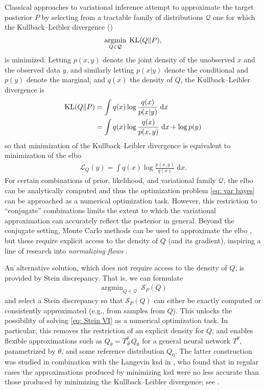 \documentclass[12pt,paper=letter]{scrreprt}
\def\KL#1#2{\textnormal{KL}({#1}\Vert{#2})}
\providecommand{\argmin}{\mathop\mathrm{arg min}}
\begin{document}
Classical approaches to variational inference attempt to approximate the target posterior $P$ by selecting from a tractable family of distributions $\mathcal{Q}$ one for which the Kullback–Leibler divergence ()
\begin{align}
\argmin_{Q \in \mathcal Q} \; \KL{Q}{P},  \label{eq: var bayes}
\end{align}
is minimized.
Letting $p(x,y)$ denote the joint density of the unobserved $x$ and the observed data $y$, and similarly letting $p(x|y)$ denote the conditional and $p(y)$ denote the marginal, and $q(x)$ the density of $Q$, the Kullback--Leibler divergence is
\begin{align*}
\KL{Q}{P} & = \int q(x) \log \frac{q(x)}{p(x|y)} \; \mathrm{d}x \\
& = \int q(x) \log \frac{q(x)}{p(x,y)} \; \mathrm{d}x + \log p(y)
\end{align*}
so that minimization of the Kullback--Leibler divergence is equivalent to minimization of the \ac{elbo} 
\begin{align*}
    \mathcal{L}_Q(y) = \int q(x) \log \frac{p(x,y)}{q(x)} \; \mathrm{d}x .
\end{align*}
For certain combinations of prior, likelihood, and variational family $\mathcal{Q}$, the \ac{elbo} can be analytically computed and thus the optimization problem \eqref{eq: var bayes} can be approached as a numerical optimization task.
However, this restriction to ``conjugate'' combinations limits the extent to which the variational approximation can accurately reflect the posterior in general.
Beyond the conjugate setting, Monte Carlo methods can be used to approximate the \ac{elbo} \citep[and its gradient; see e.g.][]{ruiz2016generalized}, but these require explicit access to the density of $Q$ (and its gradient), inspiring a line of research into \emph{normalizing flows} \citep{rezende2015variational,kingma2016improved,dinh2016density}.

An alternative solution, which does not require access to the density of $Q$, is provided by Stein discrepancy.
That is, we can formulate
\begin{align}
    \argmin_{Q \in \mathcal Q} \; \mathcal{S}_P(Q) \label{eq: Stein VI}
\end{align}
and select a Stein discrepancy so that $\mathcal{S}_P(Q)$ can either be exactly computed or consistently approximated (e.g., from samples from $Q$).
This unlocks the possibility of solving \eqref{eq: Stein VI} as a numerical optimization task.
In particular, this removes the restriction of an explicit density for $Q$, and enables flexible approximations such as $Q_\theta = T_\#^\theta Q_0$ for a general neural network $T^\theta$, parametrized by $\theta$, and some reference distribution $Q_0$.
The latter construction was studied in combination with the Langevin \ac{ksd} in \citet{Fisher2021}, who found that in regular cases the approximations produced by minimizing \ac{ksd} were no less accurate than those produced by minimizing the Kullback--Leibler divergence; see .
\end{document}
